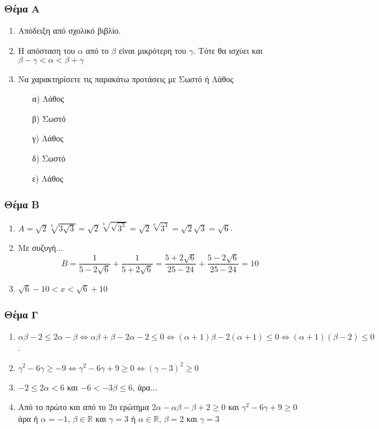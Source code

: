 \documentclass[12pt]{article}
\begin{document}
\part*{}

\section*{Θέμα Α}
  \noindent
  \begin{enumerate}
    \item Απόδειξη από σχολικό βιβλίο.
    \item Η απόσταση του $α$ από το $β$ είναι μικρότερη του $γ$. Τότε θα ισχύει και $β-γ<α<β+γ$
    \item Να χαρακτηρίσετε τις παρακάτω προτάσεις με Σωστό ή Λάθος
    \begin{enumerate}
      \item [α)] Λάθος
      \item [β)] Σωστό
      \item [γ)] Λάθος
      \item [δ)] Σωστό
      \item [ε)] Λάθος
    \end{enumerate}
  \end{enumerate}

\section*{Θέμα Β}
  \noindent
  \begin{enumerate}
    \item $Α=\sqrt{2}\sqrt[3]{3\sqrt{3}}=\sqrt{2}\sqrt[3]{\sqrt{3^3}}=\sqrt{2}\sqrt[6]{3^3}=\sqrt{2}\sqrt{3}=\sqrt{6}$.
    \item Με συζυγή...
    $$Β=\frac{1}{5-2\sqrt{6}}+\frac{1}{5+2\sqrt{6}}=\frac{5+2\sqrt{6}}{25-24}+\frac{5-2\sqrt{6}}{25-24}=10$$
    \item $\sqrt{6}-10<x<\sqrt{6}+10$
  \end{enumerate}

\section*{Θέμα Γ}
  \noindent
  \begin{enumerate}
    \item  $αβ-2\le 2α-β\Leftrightarrow αβ+β-2α-2\le 0 \Leftrightarrow (α+1)β-2(α+1)\le 0\Leftrightarrow (α+1)(β-2)\le 0$.
    \item $γ^2-6γ \ge -9\Leftrightarrow γ^2-6γ +9\ge 0\Leftrightarrow (γ-3)^2\ge 0$
    \item $-2\le 2α < 6$ και $-6< -3β \le 6$, άρα...
    \item Από το πρώτο και από το 2ο ερώτημα $2α-αβ-β+2\ge 0$ και $γ^2-6γ+9 \ge 0$ άρα
    ή $α=-1$, $β\in\mathbb{R}$ και $γ=3$
    ή $α\in\mathbb{R}$, $β=2$ και $γ=3$
  \end{enumerate}
\end{document}
